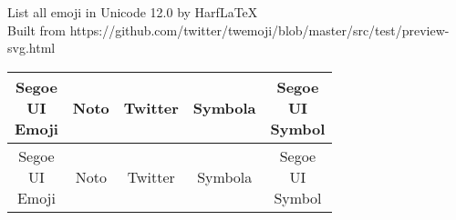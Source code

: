 \documentclass[a4paper,12pt]{article}
\begin{document}
List all emoji in Unicode 12.0 by HarfLaTeX\\
Built from https://github.com/twitter/twemoji/blob/master/src/test/preview-svg.html

\noindent
\begin{longtable}[c]{ccccc}
\parbox{5eM}{Segoe\\ UI\\ Emoji}&Noto&Twitter&Symbola&\parbox{5eM}{Segoe\\ UI\\ Symbol}\\\hline
\endfirsthead  
\parbox{5eM}{Segoe\\ UI\\ Emoji}&Noto&Twitter&Symbola&\parbox{5eM}{Segoe\\ UI\\ Symbol}\\\hline


\end{longtable}
\end{document}
